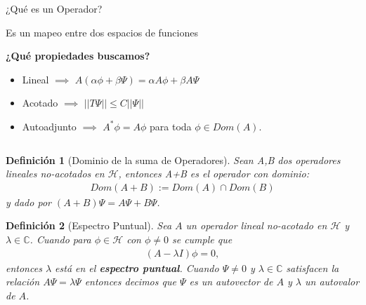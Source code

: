\documentclass[aspectratio=1610]{beamer}
\newcommand*{\field}[1]{\mathbb{#1}}
\newtheorem*{defn}{Definición}
\begin{document}
\begin{frame}{¿Qué es un Operador?}

Es un mapeo entre dos espacios de funciones
\vspace{0.05\textheight} 

\textbf{\textcolor{Ocean}{¿Qué propiedades buscamos?}}

\vspace{0.05\textheight} 
\begin{itemize}
    \item Lineal $\implies$ $A(\alpha\phi + \beta\Psi) = \alpha A\phi + \beta A \Psi$
    \vspace{0.03\textheight} 
    \item Acotado $\implies$ $||T\Psi||
    \leq C||\Psi||$
    \vspace{0.03\textheight} 
    \item Autoadjunto $\implies$ $A^{*}\phi = A\phi$ para toda $\phi \in Dom(A)$.
\end{itemize}
   
\begin{columns}
\column{37em}
\end{columns}
\end{frame}

\begin{frame}{}

\begin{defn}[Dominio de la suma de Operadores]
    Sean A,B dos operadores lineales no-acotados en $\mathcal{H}$, entonces A+B es el operador con dominio:
    \begin{align}
        Dom(A+B) := Dom(A)\cap Dom(B)
        \label{eq:SumadeOperadores}
    \end{align}
    y dado por $(A+B)\Psi = A\Psi + B\Psi$.
    \label{def:DomOPADJS}
\end{defn}
\begin{defn}[Espectro Puntual]
    Sea $A$ un operador lineal no-acotado en $\mathcal{H}$ y $\lambda\in\field{C}$. Cuando para $\phi\in\mathcal{H}$ con $\phi\neq0$ se cumple que 
    \begin{align*}
        (A-\lambda I)\phi = 0,
    \end{align*}
    entonces $\lambda$ está en el \textbf{espectro puntual}. Cuando $\Psi\neq 0$ y $\lambda\in\field{C}$ satisfacen la relación $A\Psi = \lambda\Psi$ entonces decimos que $\Psi$ es un autovector de $A$ y $\lambda$ un autovalor de $A$.
\end{defn}

\begin{columns}
\column{37em}
\end{columns}
\end{frame}
\end{document}

